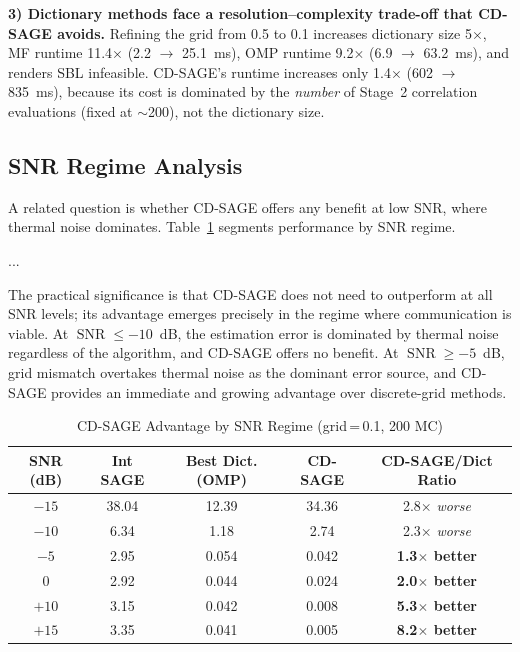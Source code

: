 \documentclass[a4paper,fleqn]{cas-dc}
\DeclareMathOperator{\SNR}{SNR}
\begin{document}
\textbf{3) Dictionary methods face a resolution--complexity trade-off that CD-SAGE avoids.} Refining the grid from 0.5 to 0.1 increases dictionary size 5$\times$, MF runtime 11.4$\times$ (2.2 $\to$ \SI{25.1}{ms}), OMP runtime 9.2$\times$ (6.9 $\to$ \SI{63.2}{ms}), and renders SBL infeasible. CD-SAGE's runtime increases only 1.4$\times$ (602 $\to$ \SI{835}{ms}), because its cost is dominated by the \textit{number} of Stage~2 correlation evaluations (fixed at $\sim$200), not the dictionary size.

\subsection{SNR Regime Analysis}

A related question is whether CD-SAGE offers any benefit at low SNR, where thermal noise dominates. Table~\ref{tab:snr_regime} segments performance by SNR regime.

...

The practical significance is that CD-SAGE does not need to outperform at all SNR levels; its advantage emerges precisely in the regime where communication is viable. At $\SNR \le -10$~dB, the estimation error is dominated by thermal noise regardless of the algorithm, and CD-SAGE offers no benefit. At $\SNR \ge -5$~dB, grid mismatch overtakes thermal noise as the dominant error source, and CD-SAGE provides an immediate and growing advantage over discrete-grid methods.

\begin{table}[cols=5,pos=h]
\centering
\caption{CD-SAGE Advantage by SNR Regime (grid$\,$=$\,$0.1, 200 MC)}
\label{tab:snr_regime}
\small
\begin{tabular}{@{}ccccc@{}}
\toprule
SNR (dB) & Int SAGE & Best Dict. (OMP) & CD-SAGE & CD-SAGE/Dict Ratio \\
\midrule
$-15$ & 38.04 & 12.39 & 34.36 & 2.8$\times$ \textit{worse} \\
$-10$ &  6.34 &  1.18 &  2.74 & 2.3$\times$ \textit{worse} \\
$ -5$ &  2.95 &  0.054 & 0.042 & \textbf{1.3$\times$ better} \\
$  0$ &  2.92 &  0.044 & 0.024 & \textbf{2.0$\times$ better} \\
$+10$ &  3.15 &  0.042 & 0.008 & \textbf{5.3$\times$ better} \\
$+15$ &  3.35 &  0.041 & 0.005 & \textbf{8.2$\times$ better} \\
\bottomrule
\end{tabular}
\end{table}
\end{document}
